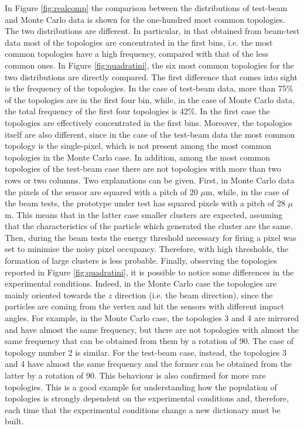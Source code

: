 In Figure \ref{fig:realcomp} the comparison between the distributions of test-beam and Monte Carlo data is shown for the one-hundred most common topologies. The two distributions are different. In particular, in that obtained from beam-test data most of the topologies are concentrated in the first bins, i.e. the most common topologies have a high frequency, compared with that of the less common ones. In Figure \ref{fig:quadratini}, the six most common topologies for the two distributions are directly compared. The first difference that comes into sight is the frequency of the topologies. In the case of test-beam data, more than 75\% of the topologies are in the first four bin, while, in the case of Monte Carlo data, the total frequency of the first four topologies is 42\%. In the first case the topologies are effectively concentrated in the first bins. Moreover, the topologies itself are also different, since in the case of the test-beam data the most common topology is the single-pixel, which is not present among the most common topologies in the Monte Carlo case. In addition, among the most common topologies of the test-beam case there are not topologies with more than two rows or two columns. Two explanations can be given. First, in Monte Carlo data the pixels of the sensor are squared with a pitch of 20 $\mu$m, while, in the case of the beam tests, the prototype under test has squared pixels with a pitch of 28 $\mu$m. This means that in the latter case smaller clusters are expected, assuming that the characteristics of the particle which generated the cluster are the same. Then, during the beam tests the energy threshold necessary for firing a pixel was set to minimise the noisy pixel occupancy. Therefore, with high thresholds, the formation of large clusters is less probable. Finally, observing the topologies reported in Figure \ref{fig:quadratini}, it is possible to notice some differences in the experimental conditions. Indeed, in the Monte Carlo case the topologies are mainly oriented towards the $z$ direction (i.e. the beam direction), since the particles are coming from the vertex and hit the sensors with different impact angles. For example, in the Monte Carlo case, the topologies 3 and 4 are mirrored and have almost the same frequency, but there are not topologies with almost the same frequency that can be obtained from them by a rotation of 90\textdegree. The case of topology number 2 is similar. For the test-beam case, instead, the topologies 3 and 4 have almost the same frequency and the former can be obtained from the latter by a rotation of 90\textdegree. This behaviour is also confirmed for more rare topologies. This is a good example for understanding how the population of topologies is strongly dependent on the experimental conditions and, therefore, each time that the experimental conditions change a new dictionary must be built.
